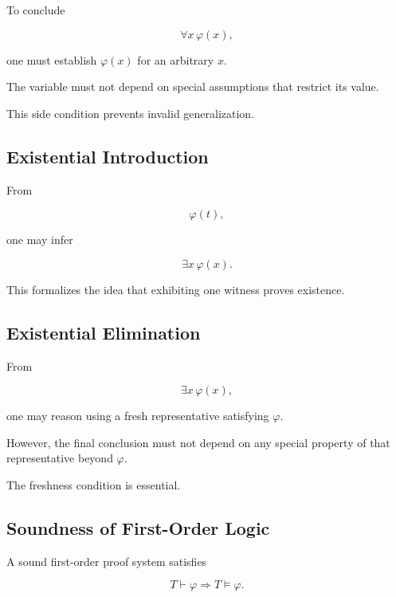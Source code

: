 To conclude

\[
\forall x\,\varphi(x),
\]

one must establish \(\varphi(x)\) for an arbitrary \(x\).

The variable must not depend on special assumptions that restrict its
value.

This side condition prevents invalid generalization.

\subsection{Existential Introduction}
\label{subsec:existential-introduction}

From

\[
\varphi(t),
\]

one may infer

\[
\boxed{
\exists x\,\varphi(x).
}
\]

This formalizes the idea that exhibiting one witness proves existence.

\subsection{Existential Elimination}
\label{subsec:existential-elimination}

From

\[
\exists x\,\varphi(x),
\]

one may reason using a fresh representative satisfying \(\varphi\).

However, the final conclusion must not depend on any special property of
that representative beyond \(\varphi\).

The freshness condition is essential.

\subsection{Soundness of First-Order Logic}
\label{subsec:first-order-soundness}

A sound first-order proof system satisfies

\[
\boxed{
T\vdash\varphi
\Longrightarrow
T\models\varphi.
}
\]

